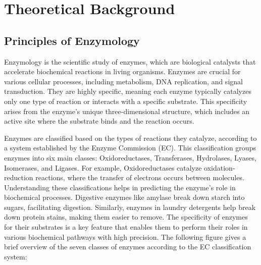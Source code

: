 \section{Theoretical Background}

\subsection{Principles of Enzymology}
\label{sec:Principles of Enzymology}

Enzymology is the scientific study of enzymes, which are biological catalysts that accelerate biochemical reactions in living organisms. Enzymes are crucial for various cellular processes, including metabolism, DNA replication, and signal transduction. They are highly specific, meaning each enzyme typically catalyzes only one type of reaction or interacts with a specific substrate. This specificity arises from the enzyme’s unique three-dimensional structure, which includes an active site where the substrate binds and the reaction occurs.
\autocite{robinsonEnzymesPrinciplesBiotechnological2015}

Enzymes are classified based on the types of reactions they catalyze, according to a system established by the Enzyme Commission (EC). This classification groups enzymes into six main classes: Oxidoreductases, Transferases, Hydrolases, Lyases, Isomerases, and Ligases. For example, Oxidoreductases catalyze oxidation-reduction reactions, where the transfer of electrons occurs between molecules. Understanding these classifications helps in predicting the enzyme’s role in biochemical processes. Digestive enzymes like amylase break down starch into sugars, facilitating digestion. Similarly, enzymes in laundry detergents help break down protein stains, making them easier to remove. The specificity of enzymes for their substrates is a key feature that enables them to perform their roles in various biochemical pathways with high precision. The following figure gives a brief overview of the seven classes of enzymes according to the EC classification system:

